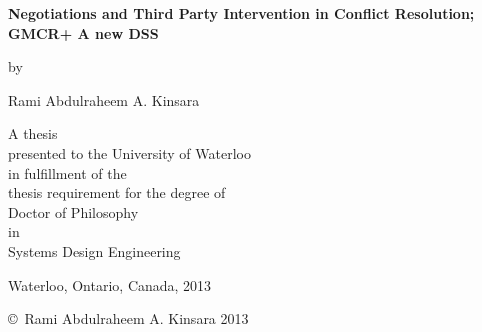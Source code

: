 \documentclass[letterpaper,12pt,titlepage,oneside,final]{book}
\begin{document}
\begin{titlepage}
        \begin{center}
        \vspace*{0.5cm}

        \Huge
        {\bf Negotiations and Third Party Intervention in Conflict Resolution; GMCR+ A new DSS}

        \vspace*{0.5cm}

        \normalsize
        by \\

        \vspace*{0.5cm}

        \Large
        Rami Abdulraheem A. Kinsara \\
        \vspace*{0.5cm}

        \normalsize
        A thesis \\
        presented to the University of Waterloo \\ 
        in fulfillment of the \\
        thesis requirement for the degree of \\
        Doctor of Philosophy \\
        in \\
        Systems Design Engineering \\

        \vspace*{0.5cm}

        Waterloo, Ontario, Canada, 2013 \\

        \vspace*{0.5cm}

        \copyright\ Rami Abdulraheem A. Kinsara 2013 \\
        
        \vspace{0.5cm}
        
	     
        \end{center}
\end{titlepage}

\pagestyle{plain}
\setcounter{page}{2}
\end{document}
